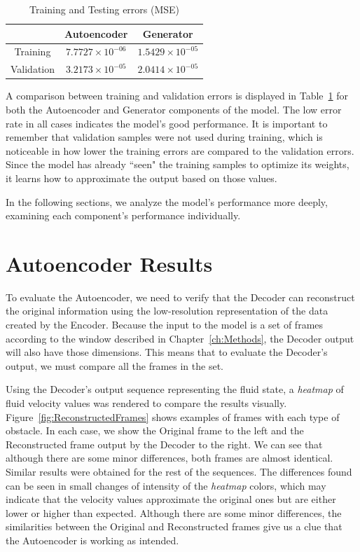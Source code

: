 \begin{table}[h]
    \caption{Training and Testing errors (MSE)}
    \centering
    \begin{tabular}{|c|c|c|}
    \hline
             & Autoencoder & Generator \\ \hline
    Training & $7.7727\times10^{-06}$ & $1.5429\times10^{-05}$ \\ \hline
    Validation  & $3.2173\times10^{-05}$ & $2.0414\times10^{-05}$ \\ \hline
    \end{tabular}
    \label{tab:errors}
\end{table}

A comparison between training and validation errors is displayed in Table~\ref{tab:errors} for both the Autoencoder and Generator components of the model. The low error rate in all cases indicates the model's good performance. It is important to remember that validation samples were not used during training, which is noticeable in how lower the training errors are compared to the validation errors. Since the model has already ``seen" the training samples to optimize its weights, it learns how to approximate the output based on those values.

In the following sections, we analyze the model's performance more deeply, examining each component's performance individually.

\section{Autoencoder Results}
\label{sec:AutoencoderResults}

To evaluate the Autoencoder, we need to verify that the Decoder can reconstruct the original information using the low-resolution representation of the data created by the Encoder. Because the input to the model is a set of frames according to the window described in Chapter~\ref{ch:Methods}, the Decoder output will also have those dimensions. This means that to evaluate the Decoder's output, we must compare all the frames in the set. 

Using the Decoder's output sequence representing the fluid state, a \textit{heatmap} of fluid velocity values was rendered to compare the results visually. Figure~\ref{fig:ReconstructedFrames} shows examples of frames with each type of obstacle. In each case, we show the Original frame to the left and the Reconstructed frame output by the Decoder to the right. We can see that although there are some minor differences, both frames are almost identical. Similar results were obtained for the rest of the sequences. The differences found can be seen in small changes of intensity of the \textit{heatmap} colors, which may indicate that the velocity values approximate the original ones but are either lower or higher than expected. Although there are some minor differences, the similarities between the Original and Reconstructed frames give us a clue that the Autoencoder is working as intended.

